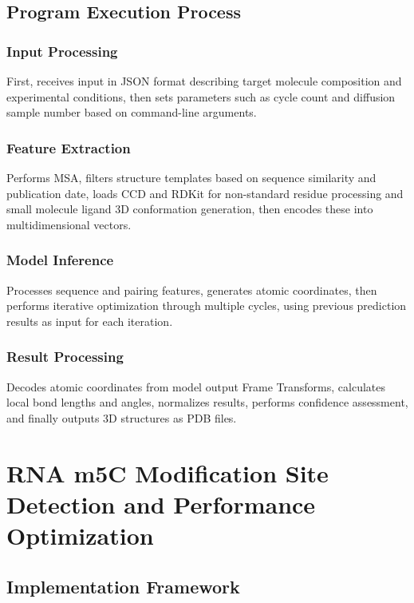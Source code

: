 \documentclass[a4paper,12pt]{article}
\begin{document}
\subsection{Program Execution Process}

\subsubsection{Input Processing}
First, receives input in JSON format describing target molecule composition and experimental conditions, then sets parameters such as cycle count and diffusion sample number based on command-line arguments.

\subsubsection{Feature Extraction}
Performs MSA, filters structure templates based on sequence similarity and publication date, loads CCD and RDKit for non-standard residue processing and small molecule ligand 3D conformation generation, then encodes these into multidimensional vectors.

\subsubsection{Model Inference}
Processes sequence and pairing features, generates atomic coordinates, then performs iterative optimization through multiple cycles, using previous prediction results as input for each iteration.

\subsubsection{Result Processing}
Decodes atomic coordinates from model output Frame Transforms, calculates local bond lengths and angles, normalizes results, performs confidence assessment, and finally outputs 3D structures as PDB files.

\newpage

\section{RNA m5C Modification Site Detection and Performance Optimization}

\subsection{Implementation Framework}
\end{document}
